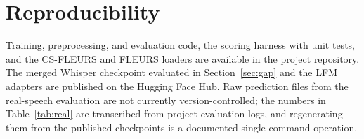 \documentclass[11pt,a4paper]{article}
\begin{document}
\section*{Reproducibility}

Training, preprocessing, and evaluation code, the scoring harness with unit tests,
and the CS-FLEURS and FLEURS loaders are available in the project repository. The
merged Whisper checkpoint evaluated in Section~\ref{sec:gap} and the LFM adapters
are published on the Hugging Face Hub. Raw prediction files from the real-speech
evaluation are not currently version-controlled; the numbers in
Table~\ref{tab:real} are transcribed from project evaluation logs, and
regenerating them from the published checkpoints is a documented single-command
operation.



\end{document}
